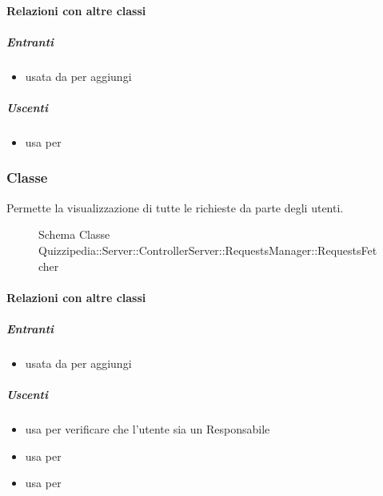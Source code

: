 \paragraph{Relazioni con altre classi}
\subparagraph{Entranti}
\begin{itemize}
\item usata da  per aggiungi
\end{itemize}
\subparagraph{Uscenti}
\begin{itemize}
\item usa  per 
\end{itemize}
\subsubsection{Classe }
Permette la visualizzazione di tutte le richieste da parte degli utenti.
\begin{figure}[H]
\centering
\noindent{}
\caption[Schema Classe RequestsFetcher]{Schema Classe Quizzipedia::Server::ControllerServer::RequestsManager::RequestsFetcher}
\end{figure}
\paragraph{Relazioni con altre classi}
\subparagraph{Entranti}
\begin{itemize}
\item usata da  per aggiungi
\end{itemize}
\subparagraph{Uscenti}
\begin{itemize}
\item usa  per verificare che l'utente sia un Responsabile
\item usa  per 
\item usa  per 
\end{itemize}
